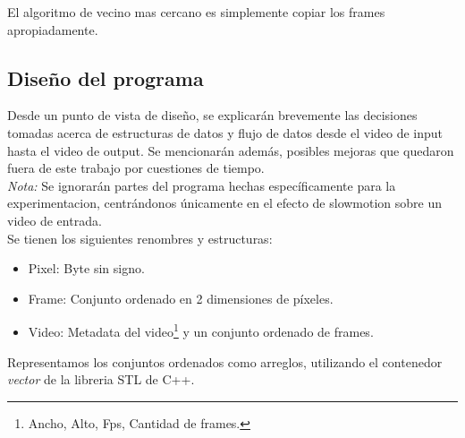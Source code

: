 El algoritmo de vecino mas cercano es simplemente copiar los frames apropiadamente.

\subsection{Diseño del programa}
Desde un punto de vista de diseño, se explicarán brevemente las decisiones tomadas acerca de estructuras de datos y flujo de datos desde el video de input hasta el video de output. Se mencionarán además, posibles mejoras que quedaron fuera de este trabajo por cuestiones de tiempo.\\

\emph{Nota:} Se ignorarán partes del programa hechas específicamente para la experimentacion, centrándonos únicamente en el efecto de slowmotion sobre un video de entrada.\\

Se tienen los siguientes renombres y estructuras:
\begin{itemize}
	\item Pixel: Byte sin signo.
	\item Frame: Conjunto ordenado en 2 dimensiones de píxeles.
	\item Video: Metadata del video\footnote{Ancho, Alto, Fps, Cantidad de frames.} y un conjunto ordenado de frames.
\end{itemize}

Representamos los conjuntos ordenados como arreglos, utilizando el contenedor \emph{vector} de la libreria STL de C++.\\

